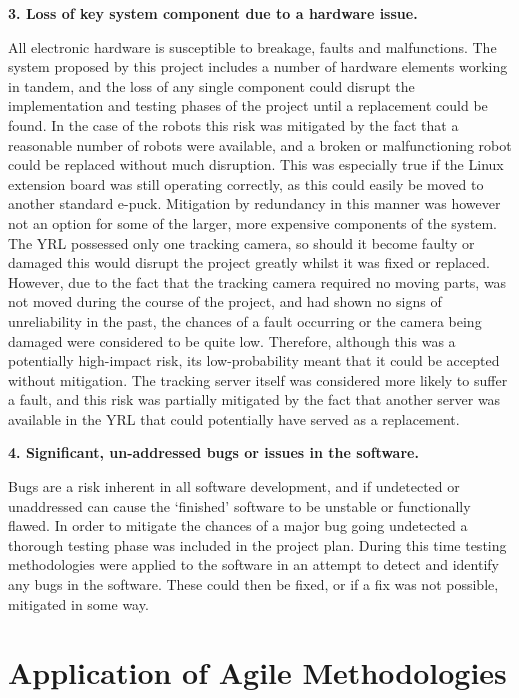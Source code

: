 \noindent\textbf{3. Loss of key system component due to a hardware issue.}

All electronic hardware is susceptible to breakage, faults and malfunctions. The system proposed by this project includes a number of hardware elements working in tandem, and the loss of any single component could disrupt the implementation and testing phases of the project until a replacement could be found. In the case of the robots this risk was mitigated by the fact that a reasonable number of robots were available, and a broken or malfunctioning robot could be replaced without much disruption. This was especially true if the Linux extension board was still operating correctly, as this could easily be moved to another standard e-puck. Mitigation by redundancy in this manner was however not an option for some of the larger, more expensive components of the system. The YRL possessed only one tracking camera, so should it become faulty or damaged this would disrupt the project greatly whilst it was fixed or replaced. However, due to the fact that the tracking camera required no moving parts, was not moved during the course of the project, and had shown no signs of unreliability in the past, the chances of a fault occurring or the camera being damaged were considered to be quite low. Therefore, although this was a potentially high-impact risk, its low-probability meant that it could be accepted without mitigation. The tracking server itself was considered more likely to suffer a fault, and this risk was partially mitigated by the fact that another server was available in the YRL that could potentially have served as a replacement.

\noindent\textbf{4. Significant, un-addressed bugs or issues in the software.}

Bugs are a risk inherent in all software development, and if undetected or unaddressed can cause the `finished' software to be unstable or functionally flawed. In order to mitigate the chances of a major bug going undetected a thorough testing phase was included in the project plan. During this time testing methodologies were applied to the software in an attempt to detect and identify any bugs in the software. These could then be fixed, or if a fix was not possible, mitigated in some way.


\section{Application of Agile Methodologies} \label{Agile}

